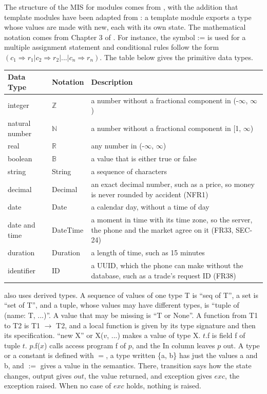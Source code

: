\documentclass[12pt, titlepage]{article}
\begin{document}
The structure of the MIS for modules comes from \citet{HoffmanAndStrooper1995},
with the addition that template modules have been adapted from
\cite{GhezziEtAl2003}: a template module exports a type whose values are made
with new, each with its own state. The mathematical notation comes from
Chapter 3 of
\citet{HoffmanAndStrooper1995}.  For instance, the symbol := is used for a
multiple assignment statement and conditional rules follow the form $(c_1
\Rightarrow r_1 | c_2 \Rightarrow r_2 | ... | c_n \Rightarrow r_n )$. The
table below gives the primitive data types.

\begin{center}
\renewcommand{\arraystretch}{1.1}
\noindent 
\begin{tabular}{l l p{9.6cm}} 
\toprule 
\textbf{Data Type} & \textbf{Notation} & \textbf{Description}\\ 
\midrule
integer & $\mathbb{Z}$ & a number without a fractional component in (-$\infty$, $\infty$) \\
natural number & $\mathbb{N}$ & a number without a fractional component in [1, $\infty$) \\
real & $\mathbb{R}$ & any number in (-$\infty$, $\infty$)\\
boolean & $\mathbb{B}$ & a value that is either true or false\\
string & String & a sequence of characters\\
decimal & Decimal & an exact decimal number, such as a price, so money is never rounded by accident (NFR1)\\
date & Date & a calendar day, without a time of day\\
date and time & DateTime & a moment in time with its time zone, so the server, the phone and the market agree on it (FR33, SEC-24)\\
duration & Duration & a length of time, such as 15 minutes\\
identifier & ID & a UUID, which the phone can make without the database, such as a trade's request ID (FR38)\\
\bottomrule
\end{tabular} 
\end{center}

\noindent \progname{} also uses derived types. A sequence of values of one type
T is ``seq of T'', a set is ``set of T'', and a tuple, whose values may have
different types, is ``tuple of (name: T, ...)''. A value that may be missing is
``T or None''. A function from
T1 to T2 is T1 $\rightarrow$ T2, and a local function is given by its type
signature and then its specification. ``new X'' or X($v$, ...) makes a value
of type X. $t$.f is field f of tuple $t$. $p$.f($x$) calls access program f of
$p$, and the In column leaves $p$ out. A type or a constant
is defined with $=$, a type written \{a, b\} has just the values a and b, and
$:=$ gives a value in the semantics. There,
transition says how the state changes, output gives $out$, the value returned,
and exception gives $exc$, the exception raised. When no case of $exc$ holds,
nothing is raised.
\end{document}
